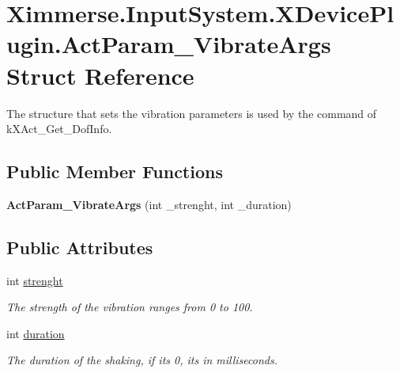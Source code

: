 \hypertarget{struct_ximmerse_1_1_input_system_1_1_x_device_plugin_1_1_act_param___vibrate_args}{}\section{Ximmerse.\+Input\+System.\+X\+Device\+Plugin.\+Act\+Param\+\_\+\+Vibrate\+Args Struct Reference}
\label{struct_ximmerse_1_1_input_system_1_1_x_device_plugin_1_1_act_param___vibrate_args}


The structure that sets the vibration parameters is used by the command of k\+X\+Act\+\_\+\+Get\+\_\+Dof\+Info.  


\subsection*{Public Member Functions}
\begin{DoxyCompactItemize}
\item 
\mbox{\label{struct_ximmerse_1_1_input_system_1_1_x_device_plugin_1_1_act_param___vibrate_args_ae7966ad6b976c8f13cc922bab7dfc0cd}} 
{\bfseries Act\+Param\+\_\+\+Vibrate\+Args} (int \+\_\+strenght, int \+\_\+duration)
\end{DoxyCompactItemize}
\subsection*{Public Attributes}
\begin{DoxyCompactItemize}
\item 
\mbox{\label{struct_ximmerse_1_1_input_system_1_1_x_device_plugin_1_1_act_param___vibrate_args_a6afbd60a2ba126c084c3eb4953b07bf0}} 
int \mbox{\hyperlink{struct_ximmerse_1_1_input_system_1_1_x_device_plugin_1_1_act_param___vibrate_args_a6afbd60a2ba126c084c3eb4953b07bf0}{strenght}}
\begin{DoxyCompactList}\small\item\em The strength of the vibration ranges from 0 to 100. \end{DoxyCompactList}\item 
\mbox{\label{struct_ximmerse_1_1_input_system_1_1_x_device_plugin_1_1_act_param___vibrate_args_ac60e3355c26b9521266a2c193a906de5}} 
int \mbox{\hyperlink{struct_ximmerse_1_1_input_system_1_1_x_device_plugin_1_1_act_param___vibrate_args_ac60e3355c26b9521266a2c193a906de5}{duration}}
\begin{DoxyCompactList}\small\item\em The duration of the shaking, if it\textquotesingle{}s 0, it\textquotesingle{}s in milliseconds. \end{DoxyCompactList}\end{DoxyCompactItemize}



